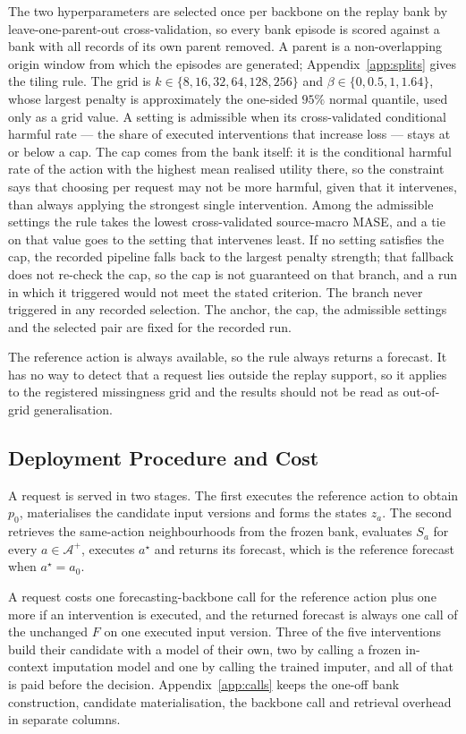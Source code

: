 \documentclass{article}
\newcommand{\calA}{\mathcal{A}}
\begin{document}
The two hyperparameters are selected once per backbone on the replay bank by
leave-one-parent-out cross-validation, so every bank episode is scored against a bank with all
records of its own parent removed. A parent is a non-overlapping origin window from which the
episodes are generated; Appendix~\ref{app:splits} gives the tiling rule. The grid is
$k \in \{8, 16, 32, 64, 128, 256\}$ and $\beta \in \{0, 0.5, 1, 1.64\}$, whose largest penalty
is approximately the one-sided $95\%$ normal quantile, used only as a grid value. A setting is admissible when its cross-validated
conditional harmful rate — the share of executed interventions that increase loss — stays at
or below a cap. The cap comes from the bank itself: it is
the
conditional harmful rate of the action with the highest mean realised utility there, so the
constraint says that choosing per request may not be more harmful, given that it intervenes,
than always applying the strongest single intervention. Among the admissible settings the rule
takes the lowest cross-validated source-macro MASE, and a tie on that value goes to the setting
that intervenes least. If no setting satisfies the cap, the recorded pipeline falls back to
the largest penalty strength; that fallback does not re-check the cap, so the cap is not
guaranteed on that branch, and a run in which it triggered would not meet the stated
criterion. The branch never triggered in any
recorded selection. The anchor, the cap, the admissible settings and the selected pair
are fixed for the recorded run.

The reference action is always available, so the rule always returns a forecast. It has no way
to detect that a request lies outside the replay support, so it applies to the registered
missingness grid and the results should not be read as out-of-grid generalisation.

\subsection{Deployment Procedure and Cost}
\label{sec:method-deploy}
A request is served in two stages. The first executes the reference action to obtain $p_0$,
materialises the candidate input versions and forms the states $z_a$. The second retrieves the
same-action neighbourhoods from the frozen bank, evaluates $S_a$ for every $a \in \calA^{+}$,
executes $a^{\star}$ and returns its forecast, which is the reference forecast when
$a^{\star} = a_0$.

A request costs one forecasting-backbone call for the reference action plus one more if an
intervention is executed, and the returned forecast is always one call of the unchanged $F$ on
one executed input version. Three of the five interventions build their candidate with a model
of their own, two by calling a frozen in-context imputation model and one by calling the
trained imputer, and all of that is paid before the decision.
Appendix~\ref{app:calls} keeps the one-off bank construction, candidate materialisation, the
backbone call and retrieval overhead in separate columns.
\end{document}
